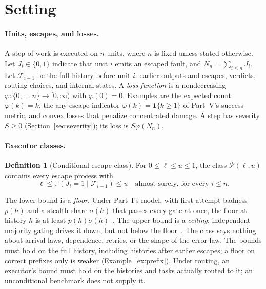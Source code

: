 \documentclass[11pt]{article}
\theoremstyle{definition}
\newtheorem{definition}[theorem]{Definition}
\theoremstyle{remark}
\newcommand{\Prb}{\mathbb P}
\newcommand{\ind}{\mathbf 1}
\begin{document}
\section{Setting}\label{sec:setting}
\paragraph{Units, escapes, and losses.}
A step of work is executed on $n$ units, where $n$ is fixed unless stated otherwise. Let
$J_i\in\{0,1\}$ indicate that unit $i$ emits an escaped fault, and $N_n=\sum_{i\le n}J_i$. Let
$\mathcal F_{i-1}$ be the full history before unit $i$: earlier outputs and escapes, verdicts,
routing choices, and internal states. A \emph{loss function} is a nondecreasing
$\varphi:\{0,\dots,n\}\to[0,\infty)$ with $\varphi(0)=0$. Examples are the expected count
$\varphi(k)=k$, the any-escape indicator $\varphi(k)=\ind\{k\ge1\}$ of Part~V's success metric,
and convex losses that penalize concentrated damage. A step has severity $S\ge0$
(Section~\ref{sec:severity}); its loss is $S\varphi(N_n)$.

\paragraph{Executor classes.}
\begin{definition}[Conditional escape class]\label{def:class}
For $0\le\ell\le u\le1$, the class $\mathcal P(\ell,u)$ contains every escape process with
\[
\ell\le\Prb(J_i=1\mid\mathcal F_{i-1})\le u\quad\text{almost surely, for every }i\le n .
\]
\end{definition}
The lower bound is a \emph{floor}. Under Part~I's model, with first-attempt badness $p(h)$ and a
stealth share $\sigma(h)$ that passes every gate at once, the floor at history $h$ is at least
$p(h)\sigma(h)$~\cite{p1,p5}. The upper bound is a \emph{ceiling}; independent majority gating
drives it down, but not below the floor~\cite{p1,p5}. The class says nothing about arrival laws,
dependence, retries, or the shape of the error law. The bounds must hold on the full history,
including histories after earlier escapes; a floor on correct prefixes only is weaker
(Example~\ref{ex:prefix}). Under routing, an executor's bound must hold on the histories and tasks
actually routed to it; an unconditional benchmark does not supply it.
\end{document}
